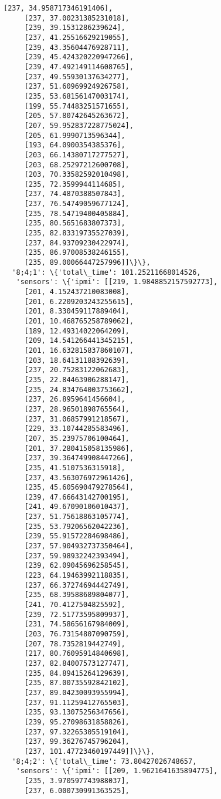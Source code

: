 \documentclass[11pt]{article}
\begin{document}
\begin{tcolorbox}[breakable, size=fbox, boxrule=.5pt, pad at break*=1mm, opacityfill=0]
\begin{Verbatim}[commandchars=\\\{\}]
     [237, 34.958717346191406],
     [237, 37.00231385231018],
     [239, 39.1531286239624],
     [237, 41.25516629219055],
     [239, 43.35604476928711],
     [239, 45.424320220947266],
     [239, 47.492149114608765],
     [237, 49.55930137634277],
     [237, 51.60969924926758],
     [235, 53.68156147003174],
     [199, 55.74483251571655],
     [205, 57.80742645263672],
     [207, 59.952837228775024],
     [205, 61.9990713596344],
     [193, 64.0900354385376],
     [203, 66.14380717277527],
     [203, 68.25297212600708],
     [203, 70.33582592010498],
     [235, 72.3599944114685],
     [237, 74.4870388507843],
     [237, 76.54749059677124],
     [235, 78.54719400405884],
     [235, 80.5651683807373],
     [235, 82.83319735527039],
     [237, 84.93709230422974],
     [235, 86.97008538246155],
     [235, 89.00066447257996]]\}\},
  '8;4;1': \{'total\_time': 101.25211668014526,
   'sensors': \{'ipmi': [[219, 1.9848852157592773],
     [201, 4.152437210083008],
     [201, 6.2209203243255615],
     [201, 8.330459117889404],
     [201, 10.468765258789062],
     [189, 12.49314022064209],
     [209, 14.541266441345215],
     [201, 16.632815837860107],
     [203, 18.64131188392639],
     [237, 20.75283122062683],
     [235, 22.84463906288147],
     [235, 24.834764003753662],
     [237, 26.8959641456604],
     [237, 28.96501898765564],
     [237, 31.06857991218567],
     [229, 33.10744285583496],
     [207, 35.23975706100464],
     [201, 37.280415058135986],
     [237, 39.364749908447266],
     [235, 41.5107536315918],
     [237, 43.563076972961426],
     [235, 45.605690479278564],
     [239, 47.66643142700195],
     [241, 49.67090106010437],
     [237, 51.75618863105774],
     [235, 53.79206562042236],
     [239, 55.91572284698486],
     [237, 57.904932737350464],
     [237, 59.98932242393494],
     [239, 62.09045696258545],
     [223, 64.19463992118835],
     [237, 66.37274694442749],
     [235, 68.39588689804077],
     [241, 70.4127504825592],
     [239, 72.51773595809937],
     [231, 74.58656167984009],
     [203, 76.73154807090759],
     [207, 78.7352819442749],
     [217, 80.76095914840698],
     [237, 82.84007573127747],
     [235, 84.89415264129639],
     [235, 87.00735592842102],
     [237, 89.04230093955994],
     [237, 91.11259412765503],
     [235, 93.13075256347656],
     [239, 95.27098631858826],
     [237, 97.32265305519104],
     [237, 99.36276745796204],
     [237, 101.47723460197449]]\}\},
  '8;4;2': \{'total\_time': 73.80427026748657,
   'sensors': \{'ipmi': [[209, 1.9621641635894775],
     [235, 3.970597743988037],
     [237, 6.000730991363525],

\end{Verbatim}
\end{tcolorbox}
\end{document}
